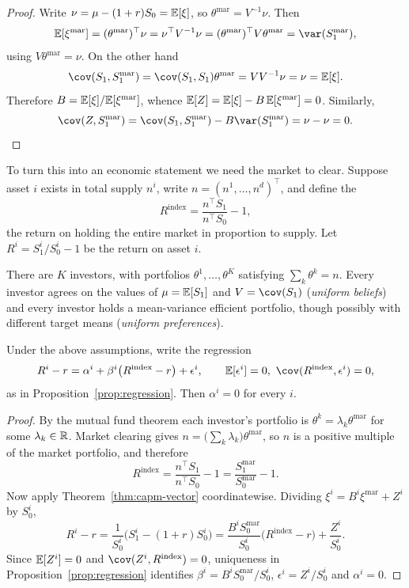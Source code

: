 \documentclass[a4paper]{scrartcl}
\begin{document}
\begin{proof}
	Write $\nu = \mu - (1+r)S_0 = \mathbb{E}[\xi]$, so $\theta^{\mathrm{mar}} = V^{-1}\nu$. Then
	$$
	\EE[\xi^{\mathrm{mar}}] = (\theta^{\mathrm{mar}})^\top \nu = \nu^\top V^{-1}\nu = (\theta^{\mathrm{mar}})^\top V \theta^{\mathrm{mar}} = \var(S_1^{\mathrm{mar}}),
	$$
	using $V\theta^{\mathrm{mar}} = \nu$. On the other hand
	$$
	\cov(S_1, S_1^{\mathrm{mar}}) = \cov(S_1,S_1)\theta^{\mathrm{mar}} = V V^{-1}\nu = \nu = \EE[\xi].
	$$
	Therefore $B = \mathbb{E}[\xi]/\mathbb{E}[\xi^{\mathrm{mar}}]$, whence $\mathbb{E}[Z] = \mathbb{E}[\xi] - B\,\mathbb{E}[\xi^{\mathrm{mar}}] = 0$. Similarly,
	$$
	\cov(Z, S_1^{\mathrm{mar}}) = \cov(S_1,S_1^{\mathrm{mar}}) - B\var(S_1^{\mathrm{mar}}) = \nu - \nu = 0. \qedhere
	$$
\end{proof}

To turn this into an economic statement we need the market to clear. Suppose asset $i$ exists in total supply $n^i$, write $n = (n^1,\dots,n^d)^\top$, and define the 
$$
R^{\mathrm{index}} = \frac{n^\top S_1}{n^\top S_0} - 1,
$$
the return on holding the entire market in proportion to supply. Let $R^i = S_1^i/S_0^i - 1$ be the return on asset $i$.

\begin{axiom}
	There are $K$ investors, with portfolios $\theta^1, \dots, \theta^K$ satisfying  $\sum_{k} \theta^k = n$. Every investor agrees on the values of $\mu = \mathbb{E}[S_1]$ and $V = \cov(S_1)$ (\emph{uniform beliefs}) and every investor holds a mean-variance efficient portfolio, though possibly with different target means (\emph{uniform preferences}).
\end{axiom}

\begin{theorem}
	Under the above assumptions, write the regression
	$$
	R^i - r = \alpha^i + \beta^i\big(R^{\mathrm{index}} - r\big) + \epsilon^i, \qquad \EE[\epsilon^i]=0,\ \cov(R^{\mathrm{index}},\epsilon^i) = 0,
	$$
	as in Proposition~\ref{prop:regression}. Then $\alpha^i = 0$ for every $i$.
\end{theorem}

\begin{proof}
	By the mutual fund theorem each investor's portfolio is $\theta^k = \lambda_k \theta^{\mathrm{mar}}$ for some $\lambda_k \in \mathbb{R}$. Market clearing gives $n = \big(\sum_k \lambda_k\big)\theta^{\mathrm{mar}}$, so $n$ is a positive multiple of the market portfolio, and therefore
	$$
	R^{\mathrm{index}} = \frac{n^\top S_1}{n^\top S_0} - 1 = \frac{S_1^{\mathrm{mar}}}{S_0^{\mathrm{mar}}} - 1.
	$$
	Now apply Theorem~\ref{thm:capm-vector} coordinatewise. Dividing $\xi^i = B^i \xi^{\mathrm{mar}} + Z^i$ by $S_0^i$,
	$$
	R^i - r = \frac{1}{S_0^i}\big(S_1^i - (1+r)S_0^i\big) = \frac{B^i S_0^{\mathrm{mar}}}{S_0^i}\big(R^{\mathrm{index}} - r\big) + \frac{Z^i}{S_0^i}.
	$$
	Since $\mathbb{E}[Z^i] = 0$ and $\cov(Z^i, R^{\mathrm{index}}) = 0$, uniqueness in Proposition~\ref{prop:regression} identifies $\beta^i = B^iS_0^{\mathrm{mar}}/S_0^i$, $\epsilon^i = Z^i/S_0^i$ and $\alpha^i = 0$.
\end{proof}
\end{document}
